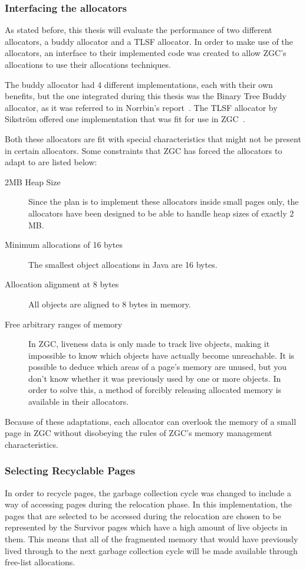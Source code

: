 \subsubsection{Interfacing the allocators}
As stated before, this thesis will evaluate the performance of two different allocators, a buddy allocator and a TLSF allocator. In order to make use of the allocators, an interface to their implemented code was created to allow ZGC's allocations to use their allocations techniques.

The buddy allocator had 4 different implementations, each with their own benefits, but the one integrated during this thesis was the Binary Tree Buddy allocator, as it was referred to in Norrbin's report~\cite{casper}. The TLSF allocator by Sikström offered one implementation that was fit for use in ZGC~\cite{joel}.

Both these allocators are fit with special characteristics that might not be present in certain allocators. Some constraints that ZGC has forced the allocators to adapt to are listed below:

\begin{description}
    \item[2MB Heap Size] Since the plan is to implement these allocators inside small pages only, the allocators have been designed to be able to handle heap sizes of exactly 2 MB. 
    \item[Minimum allocations of 16 bytes] The smallest object allocations in Java are 16 bytes.
    \item[Allocation alignment at 8 bytes] All objects are aligned to 8 bytes in memory.
    \item[Free arbitrary ranges of memory] In ZGC, liveness data is only made to track live objects, making it impossible to know which objects have actually become unreachable. It is possible to deduce which areas of a page's memory are unused, but you don't know whether it was previously used by one or more objects. In order to solve this, a method of forcibly releasing allocated memory is available in their allocators.
\end{description}

Because of these adaptations, each allocator can overlook the memory of a small page in ZGC without disobeying the rules of ZGC's memory management characteristics.

\subsubsection{Selecting Recyclable Pages}
\label{sec:implement-select}
In order to recycle pages, the garbage collection cycle was changed to include a way of accessing pages during the relocation phase. In this implementation, the pages that are selected to be accessed during the relocation are chosen to be represented by the Survivor pages which have a high amount of live objects in them. This means that all of the fragmented memory that would have previously lived through to the next garbage collection cycle will be made available through free-list allocations.

